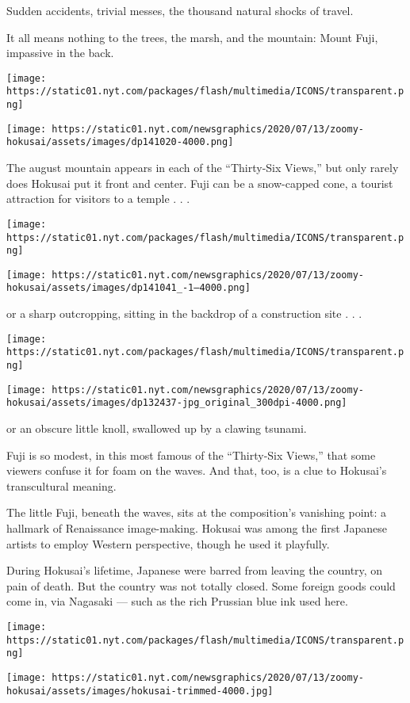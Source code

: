 Sudden accidents, trivial messes, the thousand natural shocks of travel.

It all means nothing to the trees, the marsh, and the mountain: Mount
Fuji, impassive in the back.

\texttt{[image: https://static01.nyt.com/packages/flash/multimedia/ICONS/transparent.png]}

\texttt{[image: https://static01.nyt.com/newsgraphics/2020/07/13/zoomy-hokusai/assets/images/dp141020-4000.png]}

The august mountain appears in each of the ``Thirty-Six Views,'' but
only rarely does Hokusai put it front and center. Fuji can be a
snow-capped cone, a tourist attraction for visitors to a temple . . .

\texttt{[image: https://static01.nyt.com/packages/flash/multimedia/ICONS/transparent.png]}

\texttt{[image: https://static01.nyt.com/newsgraphics/2020/07/13/zoomy-hokusai/assets/images/dp141041\_-1--4000.png]}

or a sharp outcropping, sitting in the backdrop of a construction site .
. .

\texttt{[image: https://static01.nyt.com/packages/flash/multimedia/ICONS/transparent.png]}

\texttt{[image: https://static01.nyt.com/newsgraphics/2020/07/13/zoomy-hokusai/assets/images/dp132437-jpg\_original\_300dpi-4000.png]}

or an obscure little knoll, swallowed up by a clawing tsunami.

Fuji is so modest, in this most famous of the ``Thirty-Six Views,'' that
some viewers confuse it for foam on the waves. And that, too, is a clue
to Hokusai's transcultural meaning.

The little Fuji, beneath the waves, sits at the composition's vanishing
point: a hallmark of Renaissance image-making. Hokusai was among the
first Japanese artists to employ Western perspective, though he used it
playfully.

During Hokusai's lifetime, Japanese were barred from leaving the
country, on pain of death. But the country was not totally closed. Some
foreign goods could come in, via Nagasaki --- such as the rich Prussian
blue ink used here.

\texttt{[image: https://static01.nyt.com/packages/flash/multimedia/ICONS/transparent.png]}

\texttt{[image: https://static01.nyt.com/newsgraphics/2020/07/13/zoomy-hokusai/assets/images/hokusai-trimmed-4000.jpg]}


